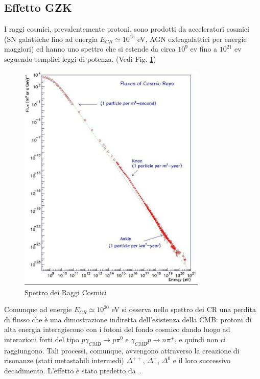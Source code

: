 \subsection{Effetto GZK}

I raggi cosmici, prevalentemente protoni, sono prodotti da acceleratori cosmici
(SN galattiche fino ad energia $E_{CR} \simeq 10^{15}$ eV, AGN extragalattici
per energie maggiori) ed hanno uno spettro che si estende da circa $10^9$ ev fino a $10^{21}$ ev
seguendo semplici leggi di potenza. (Vedi Fig. \ref{fig:CR1})
 \begin{figure}
   \centering{}
   \includegraphics[width=0.8\textwidth]{figure/CR_spectrum_1.pdf}
  \caption{Spettro dei Raggi Cosmici}
  \label{fig:CR1}
\end{figure}
Comunque ad energie $E_{CR} \simeq 10^{20}$ eV si osserva nello spettro dei CR
una perdita di flusso che è una dimostrazione indiretta dell'esistenza della
CMB: protoni di alta energia interagiscono con i fotoni del fondo cosmico dando
luogo ad interazioni forti del tipo $p \gamma_{CMB} \to p \pi^0$ e $\gamma_{CMB}
p \to n \pi^+$, e quindi non ci raggiungono.  Tali processi, comunque, avvengono
attraverso la creazione di risonanze (stati metastabili intermedi)
$\Delta^{++}$, $\Delta^{+}$, $\Delta^{0}$ e il loro successivo decadimento.
L'effetto è stato predetto
da~\textcites{1966PhRvL..16..748G}{1966JETPL...4...78Z}.

